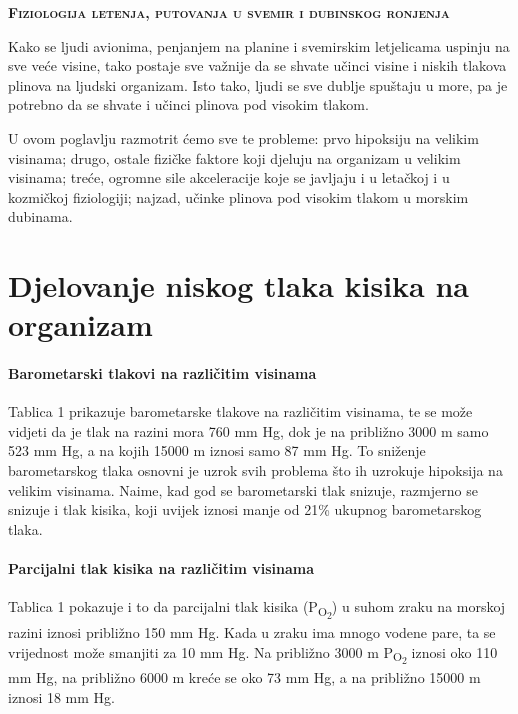 \documentclass[12pt]{article}
\newcommand{\sub}[1]{\textsubscript{#1}}
\newcommand{\paro}{P\sub{O\sub{2}}}
\newcommand{\tl}{mm Hg}
\begin{document}
\thispagestyle{empty}
\vspace*{\fill}
\begin{center}
\bfseries
\sffamily
\scshape
\Large
Fiziologija letenja, putovanja u svemir i dubinskog ronjenja
\end{center}
\vspace*{\fill}
\clearpage
\setcounter{page}{1}

Kako se ljudi avionima, penjanjem na planine i svemirskim letjelicama uspinju na
sve veće visine, tako postaje sve važnije da se shvate učinci visine i niskih
tlakova plinova na ljudski organizam. Isto tako, ljudi se sve dublje spuštaju u
more, pa je potrebno da se shvate i učinci plinova pod visokim tlakom.

U ovom poglavlju razmotrit ćemo sve te probleme: prvo hipoksiju na velikim
visinama; drugo, ostale fizičke faktore koji djeluju na organizam u velikim
visinama; treće, ogromne sile akceleracije koje se javljaju i u letačkoj i u 
kozmičkoj fiziologiji; najzad, učinke plinova pod visokim tlakom u morskim
dubinama.

\section{Djelovanje niskog tlaka kisika na organizam}

\paragraph{Barometarski tlakovi na različitim visinama} Tablica 1 prikazuje
barometarske tlakove na različitim visinama, te se može vidjeti da je tlak na
razini mora 760 \tl{}, dok je na približno 3000 m samo 523 \tl{}, a na kojih
15000 m iznosi samo 87 \tl{}. To sniženje barometarskog tlaka osnovni je uzrok
svih problema što ih uzrokuje hipoksija na velikim visinama. Naime, kad god se
barometarski tlak snizuje, razmjerno se snizuje i tlak kisika, koji uvijek
iznosi manje od 21\% ukupnog barometarskog tlaka.

\paragraph{Parcijalni tlak kisika na različitim visinama} Tablica 1 pokazuje i
to da parcijalni tlak kisika (\paro{}) u suhom zraku na morskoj razini
iznosi približno 150 \tl{}. Kada u zraku ima mnogo vodene pare, ta se vrijednost
može smanjiti za 10 \tl{}. Na približno 3000 m \paro{} iznosi oko 110 \tl{},
na približno 6000 m kreće se oko 73 \tl{}, a na približno 15000 m iznosi 18
\tl{}.
\end{document}
